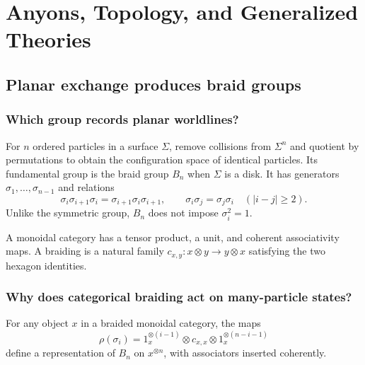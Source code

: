 \part{Anyons, Topology, and Generalized Theories}

\chapter{Planar exchange produces braid groups}
\label{ch:braids}



\section{Which group records planar worldlines?}

For $n$ ordered particles in a surface $\Sigma$, remove collisions from
$\Sigma^n$ and quotient by permutations to obtain the configuration space of
identical particles.  Its fundamental group is the braid group $B_n$ when
$\Sigma$ is a disk.  It has generators $\sigma_1,\ldots,\sigma_{n-1}$ and
relations
\[
\sigma_i\sigma_{i+1}\sigma_i
=\sigma_{i+1}\sigma_i\sigma_{i+1},
\qquad
\sigma_i\sigma_j=\sigma_j\sigma_i\quad(|i-j|\ge2).
\]
Unlike the symmetric group, $B_n$ does not impose $\sigma_i^2=1$.

A monoidal category has a tensor product, a unit, and coherent associativity
maps.  A braiding is a natural family
$c_{x,y}:x\otimes y\to y\otimes x$ satisfying the two hexagon identities.

\section{Why does categorical braiding act on many-particle states?}

\begin{theorem}
For any object $x$ in a braided monoidal category, the maps
\[
\rho(\sigma_i)
=1_x^{\otimes(i-1)}\otimes c_{x,x}\otimes
1_x^{\otimes(n-i-1)}
\]
define a representation of $B_n$ on $x^{\otimes n}$, with associators
inserted coherently.
\end{theorem}

